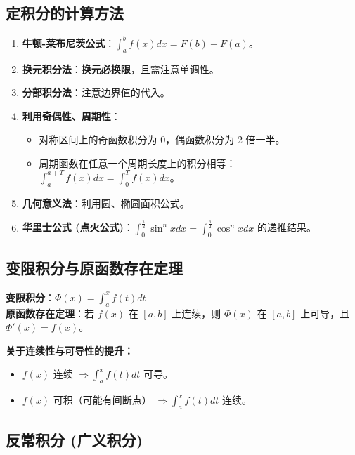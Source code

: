 \documentclass[a4paper,12pt]{ctexart}
\newenvironment{purplebox}
  {\begin{tcolorbox}[colback=white, colframe=boxpurple, boxrule=1pt, sharp corners, title=\textbf{定义/定理/核心公式}]}
  {\end{tcolorbox}}
\newenvironment{rednote}
  {\begin{tcolorbox}[colback=notepurple, colframe=highlightred, boxrule=1pt, title=\textbf{重点/技巧/手写笔记}]}
  {\end{tcolorbox}}
\begin{document}
\subsection{定积分的计算方法}
\begin{enumerate}
    \item \textbf{牛顿-莱布尼茨公式}：$\int_a^b f(x) dx = F(b) - F(a)$。
    \item \textbf{换元积分法}：\textbf{换元必换限}，且需注意单调性。
    \item \textbf{分部积分法}：注意边界值的代入。
    \item \textbf{利用奇偶性、周期性}：
    \begin{itemize}
        \item 对称区间上的奇函数积分为 0，偶函数积分为 2 倍一半。
        \item 周期函数在任意一个周期长度上的积分相等：$\int_a^{a+T} f(x) dx = \int_0^T f(x) dx$。
    \end{itemize}
    \item \textbf{几何意义法}：利用圆、椭圆面积公式。
    \item \textbf{华里士公式 (点火公式)}：$\int_0^{\frac{\pi}{2}} \sin^n x dx = \int_0^{\frac{\pi}{2}} \cos^n x dx$ 的递推结果。
\end{enumerate}

\subsection{变限积分与原函数存在定理}
\begin{purplebox}
    \textbf{变限积分}：$\Phi(x) = \int_a^x f(t) dt$ \\
    \textbf{原函数存在定理}：若 $f(x)$ 在 $[a, b]$ 上连续，则 $\Phi(x)$ 在 $[a, b]$ 上可导，且 $\Phi'(x) = f(x)$。
\end{purplebox}

\begin{rednote}
    \textbf{关于连续性与可导性的提升：}
    \begin{itemize}
        \item $f(x)$ 连续 $\Rightarrow \int_a^x f(t) dt$ 可导。
        \item $f(x)$ 可积（可能有间断点） $\Rightarrow \int_a^x f(t) dt$ 连续。
    \end{itemize}
\end{rednote}

\subsection{反常积分 (广义积分)}
\end{document}
